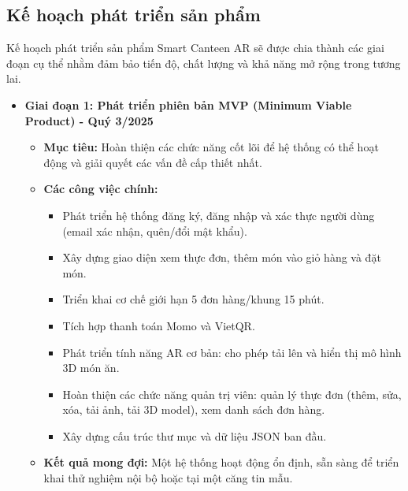 \documentclass[12pt,a4paper]{article}
\begin{document}
\subsection{Kế hoạch phát triển sản phẩm}

Kế hoạch phát triển sản phẩm Smart Canteen AR sẽ được chia thành các giai đoạn cụ thể nhằm đảm bảo tiến độ, chất lượng và khả năng mở rộng trong tương lai.
\begin{itemize}[label=\textbullet]
    \item \textbf{Giai đoạn 1: Phát triển phiên bản MVP (Minimum Viable Product) - Quý 3/2025}
    \begin{itemize}[label=\textendash]
        \item \textbf{Mục tiêu:} Hoàn thiện các chức năng cốt lõi để hệ thống có thể hoạt động và giải quyết các vấn đề cấp thiết nhất.
        \item \textbf{Các công việc chính:}
        \begin{itemize}[label=\textrightarrow]
            \item Phát triển hệ thống đăng ký, đăng nhập và xác thực người dùng (email xác nhận, quên/đổi mật khẩu).
            \item Xây dựng giao diện xem thực đơn, thêm món vào giỏ hàng và đặt món.
            \item Triển khai cơ chế giới hạn 5 đơn hàng/khung 15 phút.
            \item Tích hợp thanh toán Momo và VietQR.
            \item Phát triển tính năng AR cơ bản: cho phép tải lên và hiển thị mô hình 3D món ăn.
            \item Hoàn thiện các chức năng quản trị viên: quản lý thực đơn (thêm, sửa, xóa, tải ảnh, tải 3D model), xem danh sách đơn hàng.
            \item Xây dựng cấu trúc thư mục và dữ liệu JSON ban đầu.
        \end{itemize}
        \item \textbf{Kết quả mong đợi:} Một hệ thống hoạt động ổn định, sẵn sàng để triển khai thử nghiệm nội bộ hoặc tại một căng tin mẫu.
    \end{itemize}


\end{itemize}
\end{document}
